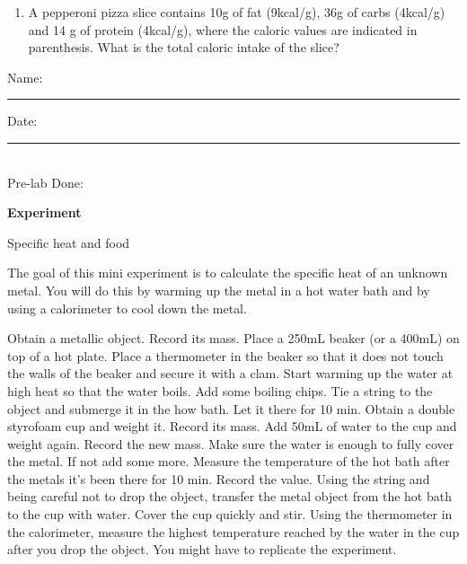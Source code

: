 \documentclass[main.tex]{subfiles}
\begin{document}
\begin{fullwidth}
\begin{enumerate}
\item A pepperoni pizza slice contains 10g of fat (9kcal/g), 36g of carbs (4kcal/g) and 14 g of protein (4kcal/g), where the caloric values are indicated in parenthesis. What is the total caloric intake of the slice? 

\end{enumerate}


\clearpage\mbox{}\clearpage



\begin{multicols}{2}
\begin{tcolorbox}[enhanced jigsaw,breakable,size=title,
colback=mybrown!05,colframe=black,fonttitle=\bfseries,
title=STUDENT INFO,pad at break=1mm, break at=15cm/0pt ]
\vspace{0.2cm}
\noindent Name: \rule{5cm}{0.4pt}Date:\rule{1cm}{0.4pt}\\
Pre-lab Done: \quad
\end{tcolorbox}
\end{multicols}
\hfill
\vspace{0.2cm}
\begin{center}
{\large \bfseries 
Experiment
\par
\Huge
Specific heat and food
\\[5pt] \par}
\vspace{0.2cm}
\end{center}
\par
\noindent
\uline{  \hfill \normalsize \hfill       }

\vspace{0.2cm}{\large \bfseries 1. Specific heat of a metal}
The goal of this mini experiment is to calculate the specific heat of an unknown metal. You will do this by warming up the metal in a hot water bath and by using a calorimeter to cool down the metal.
\begin{steps}
    \newstep[] Obtain a metallic object. Record its mass. 
    \newstep[] Place a 250mL beaker (or a 400mL) on top of a hot plate. Place a thermometer in the beaker so that it does not touch the walls of the beaker and secure it with a clam. Start warming up the water at high heat so that the water boils. Add some boiling chips.
    \newstep[] Tie a string to the object and submerge it in the how bath. Let it there for 10 min.
    \newstep[] Obtain a double styrofoam cup and weight it. Record its mass.
    \newstep[] Add 50mL of water to the cup and weight again. Record the new mass. Make sure the water is enough to fully cover the metal. If not add some more.
    \newstep[] Measure the temperature of the hot bath after the metals it's been there for 10 min. Record the value.
    \newstep[] Using the string and being careful not to drop the object, transfer the metal object from the hot bath to the cup with water. Cover the cup quickly and stir.
    \newstep[] Using the thermometer in the calorimeter, measure the highest temperature reached by the water in the cup after you drop the object.
    \newstep[] You might have to replicate the experiment.


\end{steps}
\end{fullwidth}
\end{document}
